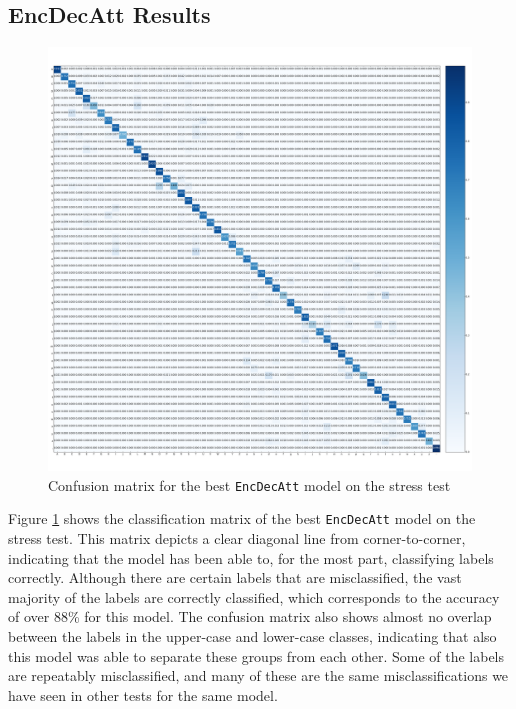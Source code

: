 \newpage
\subsection{EncDecAtt Results}
\begin{figure}[ht]
    \centering
    \includegraphics[width=1\textwidth]{fig/results/experiment4/encdecatt/confusion_matrix.png}
    \caption{Confusion matrix for the best {\tt EncDecAtt} model on the stress test}
    \label{fig:result4_encdecatt_confusion_matrix}
\end{figure}

Figure \ref{fig:result4_encdecatt_confusion_matrix} shows the classification matrix of the best {\tt EncDecAtt} model on the stress test. This matrix depicts a clear diagonal line from corner-to-corner, indicating that the model has been able to, for the most part, classifying labels correctly. Although there are certain labels that are misclassified, the vast majority of the labels are correctly classified, which corresponds to the accuracy of over 88\% for this model. The confusion matrix also shows almost no overlap between the labels in the upper-case and lower-case classes, indicating that also this model was able to separate these groups from each other. Some of the labels are repeatably misclassified, and many of these are the same misclassifications we have seen in other tests for the same model.


